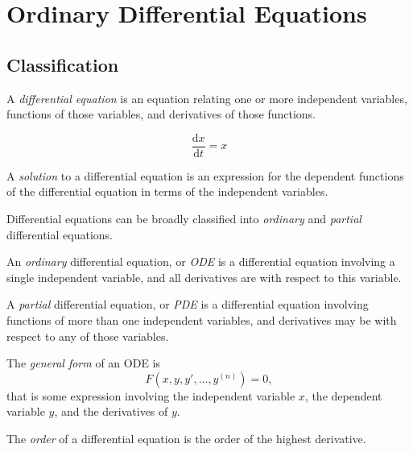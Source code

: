 \chapter{Ordinary Differential Equations}
\label{ch:diffeq}

\section{Classification}

\begin{defn}
    A \emph{differential equation} is an equation relating one or more independent variables, functions of those variables, and derivatives of those functions.
\end{defn}

\begin{exmp}\label{first-order-ode}
    \[\frac{\mathrm{d}x}{\mathrm{d}t} = x\]
\end{exmp}

\begin{defn}
    A \emph{solution} to a differential equation is an expression for the dependent functions of the differential equation in terms of the independent variables.
\end{defn}

Differential equations can be broadly classified into \emph{ordinary} and \emph{partial} differential equations.

\begin{defn}
    An \emph{ordinary} differential equation, or \emph{ODE} is a differential equation involving a single independent variable, and all derivatives are with respect to this variable.
\end{defn}

\begin{defn}
    A \emph{partial} differential equation, or \emph{PDE} is a differential equation involving functions of more than one independent variables, and derivatives may be with respect to any of those variables.
\end{defn}

\begin{defn}
    The \emph{general form} of an ODE is
    \[F(x, y, y', \ldots, y^{(n)}) = 0,\] that is some expression involving the independent variable $x$, the dependent variable $y$, and the derivatives of $y$.
\end{defn}

\begin{defn}
    The \emph{order} of a differential equation is the order of the highest derivative.
\end{defn}

